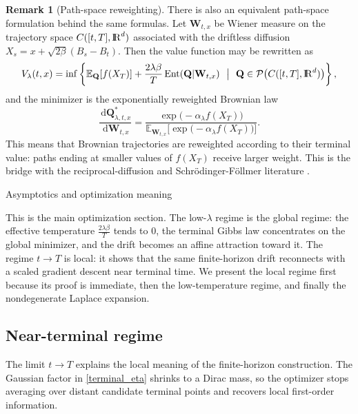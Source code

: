 \documentclass[11pt]{amsart}
\makeatletter
\renewcommand{\section}{\@startsection{section}{1}%
 \z@{.7\linespacing\@plus\linespacing}{.5\linespacing}%
 {\normalfont\large\bfseries\centering}} %
\def\R{\mathrm{I\kern-0.21emR}}
\newcommand{\E}{\mathbb{E}}
\newcommand{\Qbb}{\mathbf{Q}}
\newcommand{\W}{\mathbf{W}}
\newcommand{\Ent}{\operatorname{Ent}}
\newcommand{\dd}{\,\mathrm{d}}
\newcommand{\Prob}{\mathcal{P}}
\numberwithin{equation}{section}
\numberwithin{figure}{section}
\theoremstyle{definition}\newtheorem{remark}[theorem]{Remark}%
\makeatother
\begin{document}
\begin{remark}[Path-space reweighting]\label{path_space_remark}
There is also an equivalent path-space formulation behind the same formulas. Let $\W_{t,x}$ be Wiener measure on the trajectory space $C([t,T],\R^d)$ associated with the driftless diffusion $X_s = x + \sqrt{2\beta}(B_s - B_t)$. Then the value function may be rewritten as
$$
V_\lambda(t,x)
=
\inf \left\{ \E_{\Qbb}[f(X_T)] + \frac{2\lambda\beta}{T}\Ent(\Qbb \vert \W_{t,x}) \ \ \big\vert\ \ \Qbb \in \Prob\big( C([t,T],\R^d) \big) \right\},
$$
and the minimizer is the exponentially reweighted Brownian law
$$
\frac{\dd \Qbb_{\lambda,t,x}^*}{\dd \W_{t,x}}
=
\frac{\exp \big( - \alpha_\lambda f(X_T) \big)}{\E_{\W_{t,x}}\big[ \exp \big( - \alpha_\lambda f(X_T) \big) \big]}.
$$
This means that Brownian trajectories are reweighted according to their terminal value: paths ending at smaller values of $f(X_T)$ receive larger weight. This is the bridge with the reciprocal-diffusion and Schr\"odinger-F\"ollmer literature \cite{DaiJiaoKangLuYang23, DaiPra91, Follmer85, HuangJiaoKangLiaoLiuLiu21, TzenRaginsky19, ZhangChen22}.
\end{remark}

\section{Asymptotics and optimization meaning}\label{asymp_sec}

This is the main optimization section. The low-$\lambda$ regime is the global regime: the effective temperature $\frac{2\lambda\beta}{T}$ tends to $0$, the terminal Gibbs law concentrates on the global minimizer, and the drift becomes an affine attraction toward it. The regime $t \to T$ is local: it shows that the same finite-horizon drift reconnects with a scaled gradient descent near terminal time. We present the local regime first because its proof is immediate, then the low-temperature regime, and finally the nondegenerate Laplace expansion.

\subsection{Near-terminal regime}

The limit $t \to T$ explains the local meaning of the finite-horizon construction. The Gaussian factor in \eqref{terminal_eta} shrinks to a Dirac mass, so the optimizer stops averaging over distant candidate terminal points and recovers local first-order information.
\end{document}
